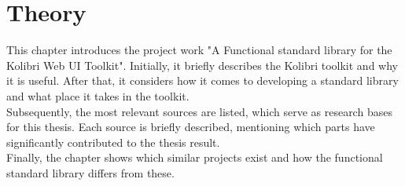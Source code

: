 \chapter{Theory}
\label{chap:theory}
This chapter introduces the project work "A Functional standard library for the
Kolibri Web UI Toolkit". Initially, it briefly describes the Kolibri toolkit
and why it is useful. After that, it considers how it comes to developing a
standard library and what place it takes in the toolkit. \\ 
Subsequently, the most relevant sources are listed, which serve as research
bases for this thesis. Each source is briefly described, mentioning which parts
have significantly contributed to the thesis result. \\ 
Finally, the chapter shows which similar projects exist and how the functional
standard library differs from these.



